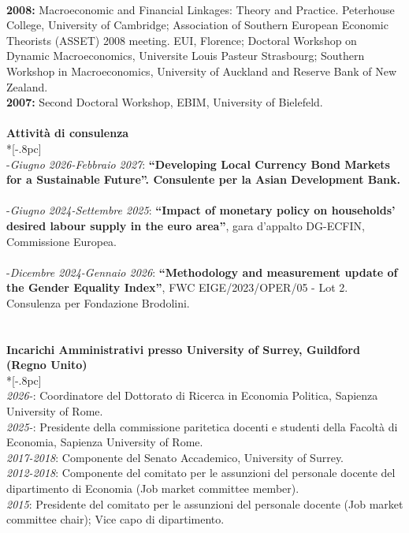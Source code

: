 \documentclass[10p]{article}
\begin{document}
\\
\textbf{2008:} {Macroeconomic and Financial Linkages: Theory and Practice. Peterhouse College, University of Cambridge; Association of Southern European Economic Theorists (ASSET) 2008 meeting. EUI, Florence; Doctoral Workshop on Dynamic Macroeconomics, Universite Louis Pasteur Strasbourg; Southern Workshop in Macroeconomics, University of Auckland and Reserve Bank of New Zealand.}
\\
\textbf{2007:} {Second Doctoral Workshop, EBIM, University of Bielefeld.}
\\
\\
{\large \bf Attivit\`{a} di consulenza} \\*[-.8pc]
\underline{\hspace{6in}} \\
-\emph{Giugno 2026-Febbraio 2027}: {\bf ``Developing Local Currency Bond Markets for a Sustainable Future''. Consulente per la Asian Development Bank.}\\
\\
-\emph{Giugno 2024-Settembre 2025}: {\bf ``Impact of monetary policy on households' desired labour supply in the euro area''}, gara d'appalto DG-ECFIN, Commissione Europea.\\
\\
-\emph{Dicembre 2024-Gennaio 2026}: {\bf ``Methodology and measurement update of the Gender Equality Index''}, FWC EIGE/2023/OPER/05 - Lot 2. Consulenza per Fondazione Brodolini.\\
\\
\\
{\large \bf Incarichi Amministrativi presso University of Surrey, Guildford (Regno Unito)} \\*[-.8pc]
\underline{\hspace{6in}} \\
\emph{2026-}: Coordinatore del Dottorato di Ricerca in Economia Politica, Sapienza University of Rome.\\
\emph{2025-}: Presidente della commissione paritetica docenti e studenti della Facoltà di Economia, Sapienza University of Rome.\\
\emph{2017-2018}: Componente del Senato Accademico, University of Surrey.\\
\emph{2012-2018}: Componente del comitato per le assunzioni del personale docente del dipartimento di Economia (Job market committee member).\\
\emph{2015}: Presidente del comitato per le assunzioni del personale docente (Job market committee chair); Vice capo di dipartimento.\\
\end{document}
